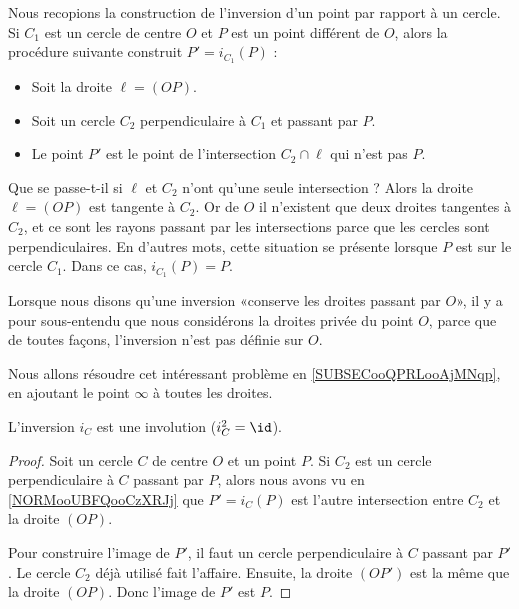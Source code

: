 \begin{normaltext}      \label{NORMooUBFQooCzXRJj}
    Nous recopions la construction de l'inversion d'un point par rapport à un cercle. Si \( C_1\) est un cercle de centre \( O\) et \( P\) est un point différent de \( O\), alors la procédure suivante construit \( P'=i_{C_1}(P)\) :
    \begin{itemize}
        \item Soit la droite \( \ell=(OP)\).
        \item Soit un cercle \( C_2\) perpendiculaire à \( C_1\) et passant par \( P\).
        \item Le point \( P'\) est le point de l'intersection \( C_2\cap\ell\) qui n'est pas \( P\).
    \end{itemize}
    Que se passe-t-il si \( \ell\) et \( C_2\) n'ont qu'une seule intersection ? Alors la droite \( \ell=(OP)\) est tangente à \( C_2\). Or de \( O \) il n'existent que deux droites tangentes à \( C_2\), et ce sont les rayons passant par les intersections parce que les cercles sont perpendiculaires. En d'autres mots, cette situation se présente lorsque \( P\) est sur le cercle \( C_1\). Dans ce cas, \( i_{C_1}(P)=P\).
\end{normaltext}

\begin{remark}
    Lorsque nous disons qu'une inversion «conserve les droites passant par \( O\)», il y a pour sous-entendu que nous considérons la droites privée du point \( O\), parce que de toutes façons, l'inversion n'est pas définie sur \( O\).

    Nous allons résoudre cet intéressant problème en \ref{SUBSECooQPRLooAjMNqp}, en ajoutant le point \( \infty\) à toutes les droites.
\end{remark}

\begin{corollary}
    L'inversion \( i_C\) est une involution (\( i_C^2=\id\)).
\end{corollary}

\begin{proof}
    Soit un cercle \( C\) de centre \( O\) et un point \( P\). Si \( C_2\) est un cercle perpendiculaire à \( C\) passant par \( P\), alors nous avons vu en \ref{NORMooUBFQooCzXRJj} que \( P'=i_C(P)\) est l'autre intersection entre \( C_2\) et la droite \( (OP)\).

    Pour construire l'image de \( P'\), il faut un cercle perpendiculaire à \( C\) passant par \( P'\). Le cercle \( C_2\) déjà utilisé fait l'affaire. Ensuite, la droite \( (OP')\) est la même que la droite \( (OP)\). Donc l'image de \( P'\) est \( P\).
\end{proof}

